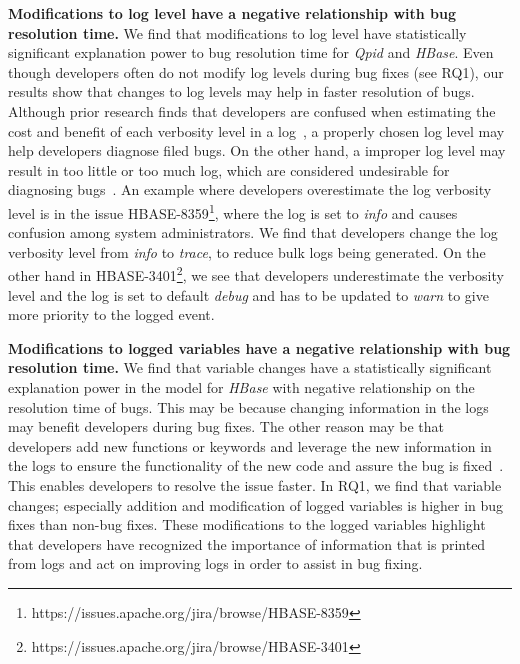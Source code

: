 \textbf{Modifications to log level have a negative relationship with bug resolution time.} 
We find that modifications to log level have statistically significant explanation power to bug resolution time for \emph{Qpid} and \emph{HBase}. Even though developers often do not modify log levels during bug fixes (see RQ1), our results show that changes to log levels may help in faster resolution of bugs. Although prior research finds that developers are confused when estimating the cost and benefit of each verbosity level in a log~\cite{Characterizinglogs}, a properly chosen log level may help developers diagnose filed bugs. On the other hand, a improper log level may result in too little or too much log, which are considered undesirable for diagnosing bugs~\cite{zhao2014lprof,Fu1}. An example where developers overestimate the log verbosity level is in the issue HBASE-8359\footnote{https://issues.apache.org/jira/browse/HBASE-8359}, where the log is set to \emph{info} and causes confusion among system administrators. We find that developers change the log verbosity level from \emph{info} to \emph{trace}, to reduce bulk logs being generated. On the other hand in HBASE-3401\footnote{https://issues.apache.org/jira/browse/HBASE-3401}, we see that developers underestimate the verbosity level and the log is set to default \emph{debug} and has to be updated to \emph{warn} to give more priority to the logged event. 

\textbf{Modifications to logged variables have a negative relationship with bug resolution time.} 
We find that variable changes have a statistically significant explanation power in the model for \emph{HBase} with negative relationship on the resolution time of bugs. This may be because changing information in the logs may benefit developers during bug fixes. The other reason may be that developers add new functions or keywords and leverage the new information in the logs to ensure the functionality of the new code and assure the bug is fixed~\cite{Fu1}. This enables developers to resolve the issue faster. In RQ1, we find that variable changes; especially addition and modification of logged variables is higher in bug fixes than non-bug fixes. These modifications to the logged variables highlight that developers have recognized the importance of information that is printed from logs and act on improving logs in order to assist in bug fixing.


